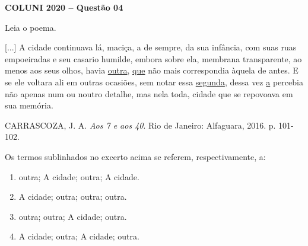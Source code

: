 \textbf{COLUNI 2020 -- Questão 04}\par\medskip Leia o poema.

\par

[...] A cidade continuava lá, maciça, a de sempre, da sua infância, com suas ruas empoeiradas e seu casario humilde, embora sobre ela, membrana transparente, ao menos aos seus olhos, havia \underline{outra}, \underline{que} não mais correspondia àquela de antes. E se ele voltara ali em outras ocasiões, sem notar essa \underline{segunda}, dessa vez \underline{a} percebia não apenas num ou noutro detalhe, mas nela toda, cidade que se repovoava em sua memória.

\par

CARRASCOZA, J. A. \textit{Aos 7 e aos 40}. Rio de Janeiro: Alfaguara, 2016. p. 101-102.

\par

Os termos sublinhados no excerto acima se referem, respectivamente, a:\begin{enumerate}
\item outra; A cidade; outra; A cidade.
\item A cidade; outra; outra; outra.
\item outra; outra; A cidade; outra.
\item A cidade; outra; A cidade; outra.\end{enumerate}
